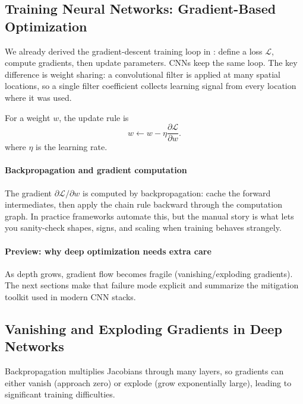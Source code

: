 \subsection{Training Neural Networks: Gradient-Based Optimization}
\label{sec:cnn_training_neural_networks_gradient_based_optimization}

We already derived the gradient-descent training loop in : define a loss \(\mathcal{L}\), compute gradients, then update parameters. CNNs keep the same loop. The key difference is weight sharing: a convolutional filter is applied at many spatial locations, so a single filter coefficient collects learning signal from every location where it was used.

For a weight $w$, the update rule is
\begin{equation}
w \leftarrow w - \eta \frac{\partial \mathcal{L}}{\partial w}.
\label{eq:cnn_sgd_update}
\end{equation}
where $\eta$ is the learning rate.

\paragraph{Backpropagation and gradient computation}
The gradient \(\partial \mathcal{L}/\partial w\) is computed by backpropagation: cache the forward intermediates, then apply the chain rule backward through the computation graph. In practice frameworks automate this, but the manual story is what lets you sanity-check shapes, signs, and scaling when training behaves strangely.

\paragraph{Preview: why deep optimization needs extra care}
As depth grows, gradient flow becomes fragile (vanishing/exploding gradients). The next sections make that failure mode explicit and summarize the mitigation toolkit used in modern CNN stacks.


\subsection{Vanishing and Exploding Gradients in Deep Networks}
\label{sec:cnn_vanishing_and_exploding_gradients_in_deep_networks}

Backpropagation multiplies Jacobians through many layers, so gradients can either vanish (approach zero) or explode (grow exponentially large), leading to significant training difficulties.

